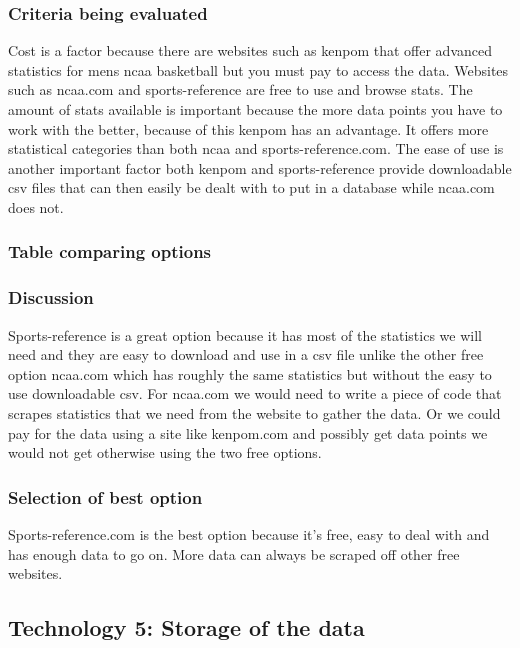 \documentclass[journal,onecolumn]{IEEEtran}
\begin{document}
\subsubsection{Criteria being evaluated}
Cost is a factor because there are websites such as kenpom that offer advanced statistics for mens ncaa basketball but you must pay to access the data. Websites such as ncaa.com and sports-reference are free to use and browse stats. The amount of stats available is important because the more data points you have to work with the better, because of this kenpom has an advantage. It offers more statistical categories than both ncaa and sports-reference.com. The ease of use is another important factor both kenpom and sports-reference provide downloadable csv files that can then easily be dealt with to put in a database while ncaa.com does not. 

\subsubsection{Table comparing options}


\subsubsection{Discussion}
Sports-reference is a great option because it has most of the statistics we will need and they are easy to download and use in a csv file unlike the other free option ncaa.com which has roughly the same statistics but without the easy to use downloadable csv. For ncaa.com we would need to write a piece of code that scrapes statistics that we need from the website to gather the data. Or we could pay for the data using a site like kenpom.com and possibly get data points we would not get otherwise using the two free options.

\subsubsection{Selection of best option}
Sports-reference.com is the best option because it’s free, easy to deal with and has enough data to go on. More data can always be scraped off other free websites.




\subsection{Technology 5: Storage of the data}
\end{document}
